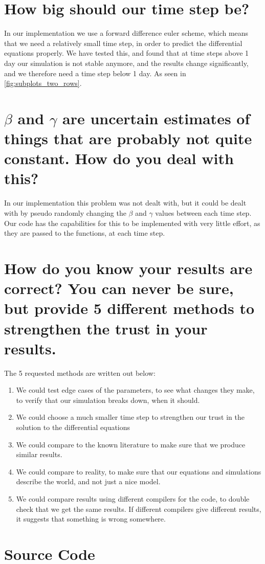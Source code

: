 \documentclass{article}
\begin{document}
\section*{How big should our time step be?}
In our implementation we use a forward difference euler scheme, which means that we need a relatively small time step, in order to predict the differential equations properly. We have tested this, and found that at time steps above 1 %
day our simulation is not stable anymore, and the results change significantly, and we therefore need a time step below 1 day. As seen in \cref{fig:subplots_two_rows}.

\section*{$\beta$ and $\gamma$ are uncertain estimates of things that are probably not quite constant. How
do you deal with this?}
In our implementation this problem was not dealt with, but it could be dealt with by pseudo randomly changing the $\beta$ and $\gamma$ values between each time step. Our code has the capabilities for this to be implemented with very little effort, as they are passed to the functions, at each time step.

\section*{How do you know your results are correct? You can never be sure, but provide 5 different methods to strengthen the trust in your results.}
The 5 requested methods are written out below:
\begin{enumerate}
    \item We could test edge cases of the parameters, to see what changes they make, to verify that our simulation breaks down, when it should.
    \item We could choose a much smaller time step to strengthen our trust in the solution to the differential equations
    \item We could compare to the known literature to make sure that we produce similar results.
    \item We could compare to reality, to make sure that our equations and simulations describe the world, and not just a nice model.
    \item We could compare results using different compilers for the code, to double check that we get the same results. If different compilers give different results, it suggests that something is wrong somewhere.
\end{enumerate}
\newpage
\section*{Source Code}

\end{document}
